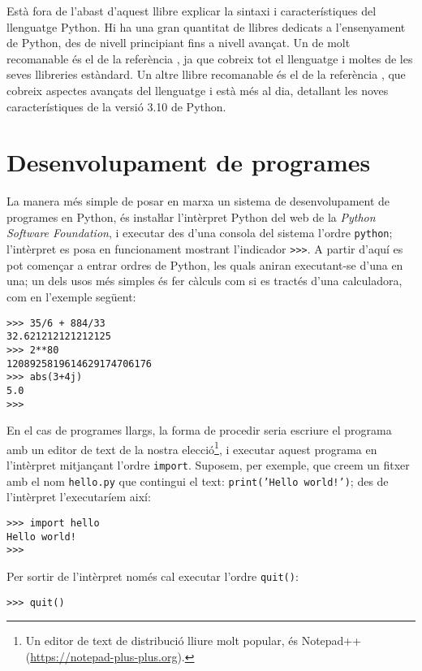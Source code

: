 Està fora de l'abast d'aquest llibre explicar la sintaxi i característiques del llenguatge Python. Hi ha una gran quantitat de llibres dedicats a l'ensenyament de Python, des de nivell principiant fins a nivell avançat. Un de molt recomanable és el de la referència \cite{SUM}, ja que cobreix tot el llenguatge i moltes de les seves llibreries estàndard. Un altre llibre recomanable és el de la referència \cite{RAM}, que cobreix aspectes avançats del llenguatge i està més al dia, detallant les noves característiques de la versió 3.10 de Python.


\section{Desenvolupament de programes}\label{sec:py-desenvel-prog}

La manera més simple de posar en marxa un sistema de desenvolupament de programes en Python, és instaŀlar l'intèrpret Python del web de la \textit{Python Software Foundation}, i executar des d'una consola del sistema l'ordre \texttt{python};
l'intèrpret es posa en funcionament mostrant l'indicador \texttt{>{}>{}>}. A partir d'aquí es pot començar a entrar ordres de Python, les quals aniran executant-se d'una en una; un dels usos més simples és  fer càlculs com si es tractés d'una calculadora, com en l'exemple següent:
\begin{lstlisting}
>>> 35/6 + 884/33
32.621212121212125
>>> 2**80
1208925819614629174706176
>>> abs(3+4j)
5.0
>>>
\end{lstlisting}

En el cas de programes llargs, la forma de procedir seria escriure el programa amb un editor de text de la nostra elecció\footnote{Un editor de text de distribució lliure molt popular, és Notepad++ (\href{https://notepad-plus-plus.org/}{https:/\!\!/notepad-plus-plus.org}).}, i executar aquest programa en l'intèrpret mitjançant l'ordre \texttt{import}. Suposem, per exemple, que creem un fitxer amb el nom \texttt{hello.py} que contingui el text: \texttt{print('Hello world!')}; des de l'intèrpret l'executaríem així:
\begin{lstlisting}
>>> import hello
Hello world!
>>>
\end{lstlisting}

Per sortir de l'intèrpret només cal executar l'ordre \texttt{quit()}:
\begin{lstlisting}
>>> quit()
\end{lstlisting}


